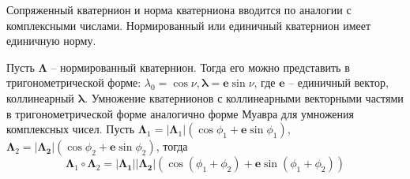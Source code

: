\documentclass{article}
\begin{document}
Сопряженный кватернион и норма кватерниона вводится по аналогии с комплексными
числами. Нормированный или единичный кватернион имеет единичную норму.

Пусть $\mathbf{\Lambda}$ -- нормированный кватернион. Тогда его можно
представить в тригонометрической форме: $\lambda_0 = \cos{\nu},
\mathbf{\lambda} = \mathbf{e}\sin{\nu}$, где $\mathbf{e}$ -- единичный вектор,
коллинеарный $\mathbf{\lambda}$. Умножение кватернионов с коллинеарными
векторными частями в тригонометрической
форме аналогично форме Муавра для умножения комплексных чисел. Пусть
$\mathbf{\Lambda}_1 = \left|\mathbf{\Lambda}_1\right|\left(\cos{\phi_1}
+\mathbf{e}\sin{\phi_1}\right)$, $\mathbf{\Lambda}_2 =
\left|\mathbf{\Lambda_2}\right|\left(\cos{\phi_2}
+\mathbf{e}\sin{\phi_2}\right)$, тогда
$$
\mathbf{\Lambda}_1\circ\mathbf{\Lambda}_2 =
\left|\mathbf{\Lambda_1}\right|\left|\mathbf{\Lambda_2}\right|\left(\cos{\left(\phi_1+\phi_2\right)}+\mathbf{e}\sin{\left(\phi_1+\phi_2\right)}\right)
$$
\end{document}
